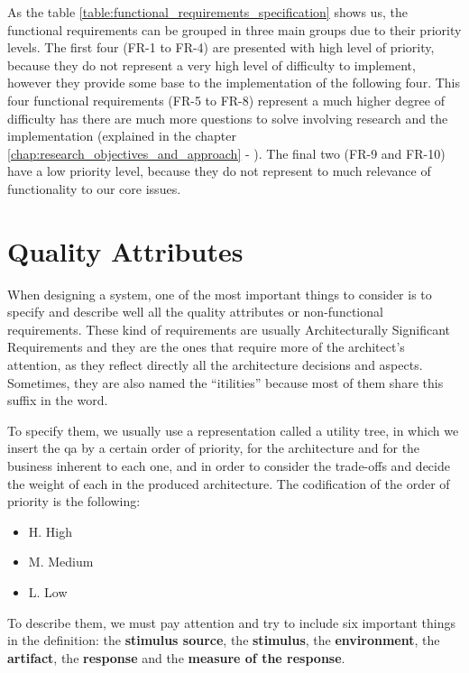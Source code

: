 As the table \ref{table:functional_requirements_specification} shows us, the functional requirements can be grouped in three main groups due to their priority levels. The first four (FR-1 to FR-4) are presented with high level of priority, because they do not represent a very high level of difficulty to implement, however they provide some base to the implementation of the following four. This four functional requirements (FR-5 to FR-8) represent a much higher degree of difficulty has there are much more questions to solve involving research and the implementation (explained in the chapter \ref{chap:research_objectives_and_approach} - ). The final two (FR-9 and FR-10) have a low priority level, because they do not represent to much relevance of functionality to our core issues.


\section{Quality Attributes}
\label{sec:quality_attributes}

When designing a system, one of the most important things to consider is to specify and describe well all the quality attributes or non-functional requirements. These kind of requirements are usually Architecturally Significant Requirements and they are the ones that require more of the architect's attention, as they reflect directly all the architecture decisions and aspects. Sometimes, they are also named the ``itilities'' because most of them share this suffix in the word.

To specify them, we usually use a representation called a utility tree, in which we insert the \gls{qa} by a certain order of priority, for the architecture and for the business inherent to each one, and in order to consider the trade-offs and decide the weight of each in the produced architecture. The codification of the order of priority is the following:

\begin{itemize}
    \item H. High
    \item M. Medium
    \item L. Low
\end{itemize}

To describe them, we must pay attention and try to include six important things in the definition: the \textbf{stimulus source}, the \textbf{stimulus}, the \textbf{environment}, the \textbf{artifact}, the \textbf{response} and the \textbf{measure of the response}.

